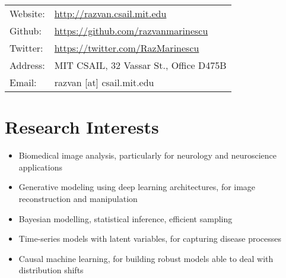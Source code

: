 \documentclass[a4paper,10pt]{article} %
\begin{document}
\pagestyle{empty} %



\par{\bigskip\par}

\begin{tabular}{ll}
 Website: & \url{http://razvan.csail.mit.edu}\\
 Github: & \url{https://github.com/razvanmarinescu}\\
 Twitter: & \url{https://twitter.com/RazMarinescu}\\
 Address: & MIT CSAIL, 32 Vassar St., Office D475B\\
 Email: & razvan [at] csail.mit.edu\\

\end{tabular}



\vspace{-0.5em}
\section*{Research Interests}
\begin{itemize}
\item Biomedical image analysis, particularly for neurology and neuroscience applications
\item Generative modeling using deep learning architectures, for image reconstruction and manipulation
\item Bayesian modelling, statistical inference, efficient sampling
\item Time-series models with latent variables, for capturing disease processes
\item Causal machine learning, for building robust models able to deal with distribution shifts
\end{itemize}

\vspace{-0.5em}
\end{document}
